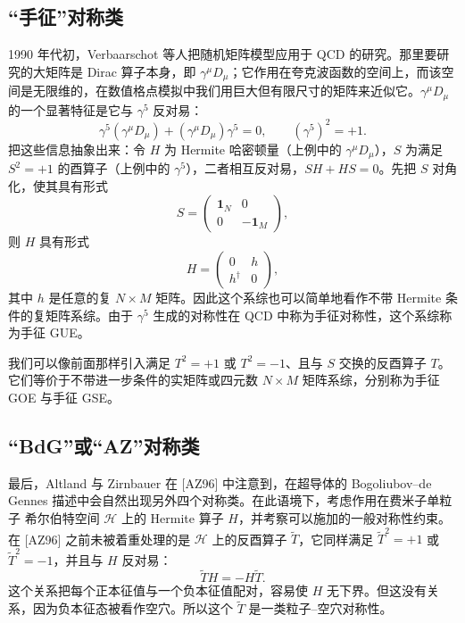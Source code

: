 \subsection{“手征”对称类}

1990 年代初，Verbaarschot 等人把随机矩阵模型应用于 QCD 的研究。那里要研究的大矩阵是 Dirac 算子本身，即 $\gamma^\mu D_\mu$；它作用在夸克波函数的空间上，而该空间是无限维的，在数值格点模拟中我们用巨大但有限尺寸的矩阵来近似它。$\gamma^\mu D_\mu$ 的一个显著特征是它与 $\gamma^5$ 反对易：
\begin{equation}
\gamma^5(\gamma^\mu D_\mu)+(\gamma^\mu D_\mu)\gamma^5=0,\qquad (\gamma^5)^2=+1. \tag{11.31}
\end{equation}
把这些信息抽象出来：令 $H$ 为 Hermite 哈密顿量（上例中的 $\gamma^\mu D_\mu$），$S$ 为满足 $S^2=+1$ 的酉算子（上例中的 $\gamma^5$），二者相互反对易，$SH+HS=0$。先把 $S$ 对角化，使其具有形式
\begin{equation}
S=\begin{pmatrix}\mathbf{1}_N&0\\0&-\mathbf{1}_M\end{pmatrix}, \tag{11.32}
\end{equation}
则 $H$ 具有形式
\begin{equation}
H=\begin{pmatrix}0&h\\ h^\dagger&0\end{pmatrix}, \tag{11.33}
\end{equation}
其中 $h$ 是任意的复 $N\times M$ 矩阵。因此这个系综也可以简单地看作不带 Hermite 条件的复矩阵系综。由于 $\gamma^5$ 生成的对称性在 QCD 中称为手征对称性，这个系综称为手征 GUE。

我们可以像前面那样引入满足 $T^2=+1$ 或 $T^2=-1$、且与 $S$ 交换的反酉算子 $T$。它们等价于不带进一步条件的实矩阵或四元数 $N\times M$ 矩阵系综，分别称为手征 GOE 与手征 GSE。

\subsection{“BdG”或“AZ”对称类}

最后，Altland 与 Zirnbauer 在 [AZ96] 中注意到，在超导体的 Bogoliubov--de Gennes 描述中会自然出现另外四个对称类。在此语境下，考虑作用在费米子单粒子 希尔伯特空间 $\mathcal{H}$ 上的 Hermite 算子 $H$，并考察可以施加的一般对称性约束。在 [AZ96] 之前未被着重处理的是 $\mathcal{H}$ 上的反酉算子 $\tilde T$，它同样满足 $\tilde T^2=+1$ 或 $\tilde T^2=-1$，并且与 $H$ 反对易：
\begin{equation}
\tilde TH=-H\tilde T. \tag{11.34}
\end{equation}
这个关系把每个正本征值与一个负本征值配对，容易使 $H$ 无下界。但这没有关系，因为负本征态被看作空穴。所以这个 $\tilde T$ 是一类粒子--空穴对称性。

